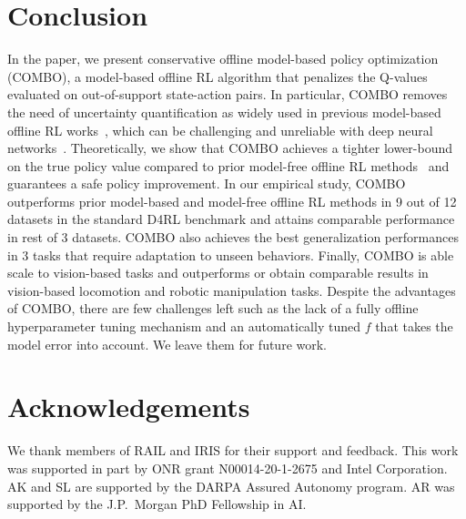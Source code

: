 \documentclass{article}
\begin{document}




\section{Conclusion}
In the paper, we present conservative offline model-based policy optimization (COMBO), a model-based offline RL algorithm that penalizes the Q-values evaluated on out-of-support state-action pairs. In particular, COMBO removes the need of uncertainty quantification as widely used in previous model-based offline RL works~\citep{kidambi2020morel,yu2020mopo}, which can be challenging and unreliable with deep neural networks~\citep{ovadia2019can}. Theoretically, we show that COMBO achieves a tighter lower-bound on the true policy value compared to prior model-free offline RL methods~\citep{kumar2020conservative} and guarantees a safe policy improvement. In our empirical study, COMBO outperforms prior model-based and model-free offline RL methods in 9 out of 12 datasets in the standard D4RL benchmark and attains comparable performance in rest of 3 datasets. COMBO also achieves the best generalization performances in 3 tasks that require adaptation to unseen behaviors. Finally, COMBO is able scale to vision-based tasks and outperforms or obtain comparable results in vision-based locomotion and robotic manipulation tasks. Despite the advantages of COMBO, there are few challenges left such as the lack of a fully offline hyperparameter tuning mechanism and an automatically tuned $f$ that takes the model error into account. We leave them for future work.

\section*{Acknowledgements}
We thank members of RAIL and IRIS for their support and feedback. This work was supported in part by ONR grant N00014-20-1-2675 and Intel Corporation. AK and SL are supported by the DARPA Assured Autonomy program. AR was supported by the J.P.~Morgan PhD Fellowship in AI.
\end{document}
